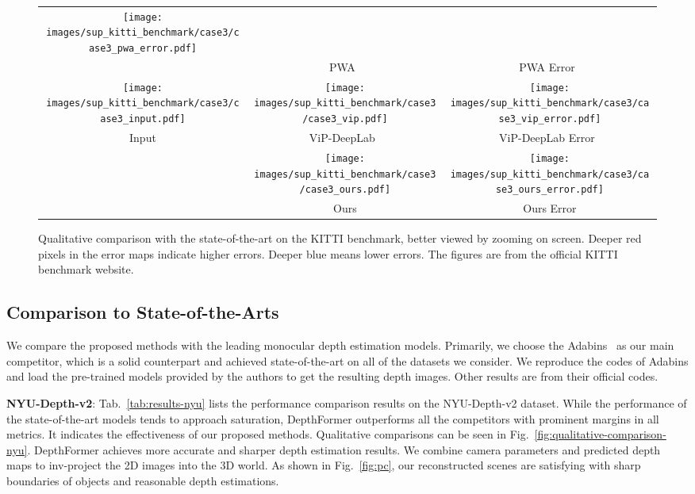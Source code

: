 \documentclass[twocolumn]{svjour3}    \pdfoutput=1
\begin{document}
\begin{figure*}[t]
\begin{tabular}{ccc}
       \texttt{[image: images/sup\_kitti\_benchmark/case3/case3\_pwa\_error.pdf]}
       \\
       &PWA~\citep{lee2021PWA}&PWA Error~\citep{lee2021PWA}
       \\
       \texttt{[image: images/sup\_kitti\_benchmark/case3/case3\_input.pdf]}&
       \texttt{[image: images/sup\_kitti\_benchmark/case3/case3\_vip.pdf]}&
       \texttt{[image: images/sup\_kitti\_benchmark/case3/case3\_vip\_error.pdf]}
       \\
       Input&ViP-DeepLab~\citep{qiao2021vip}&ViP-DeepLab Error~\citep{qiao2021vip}
       \\
       &
       \texttt{[image: images/sup\_kitti\_benchmark/case3/case3\_ours.pdf]}&
       \texttt{[image: images/sup\_kitti\_benchmark/case3/case3\_ours\_error.pdf]}
       \\
       &Ours&Ours Error
   \end{tabular}
   \caption{Qualitative comparison with the state-of-the-art on the KITTI benchmark, better viewed by zooming on screen. Deeper red pixels in the error maps indicate higher errors. Deeper blue means lower errors. The figures are from the official KITTI benchmark website.}
   \label{fig:sup-qualitative-comparison-kitti}
\end{figure*}

 


\subsection{Comparison to State-of-the-Arts}
We compare the proposed methods with the leading monocular depth estimation models. Primarily, we choose the Adabins~\citep{bhat2021adabins} as our main competitor, which is a solid counterpart and achieved state-of-the-art on all of the datasets we consider. We reproduce the codes of Adabins and load the pre-trained models provided by the authors to get the resulting depth images. Other results are from their official codes.

\textbf{NYU-Depth-v2}: Tab.~\ref{tab:results-nyu} lists the performance comparison results on the NYU-Depth-v2 dataset. While the performance of the state-of-the-art models tends to approach saturation, DepthFormer outperforms all the competitors with prominent margins in all metrics. It indicates the effectiveness of our proposed methods. Qualitative comparisons can be seen in Fig.~\ref{fig:qualitative-comparison-nyu}. DepthFormer achieves more accurate and sharper depth estimation results. We combine camera parameters and predicted depth maps to inv-project the 2D images into the 3D world. As shown in Fig.~\ref{fig:pc}, our reconstructed scenes are satisfying with sharp boundaries of objects and reasonable depth estimations.
\end{document}
